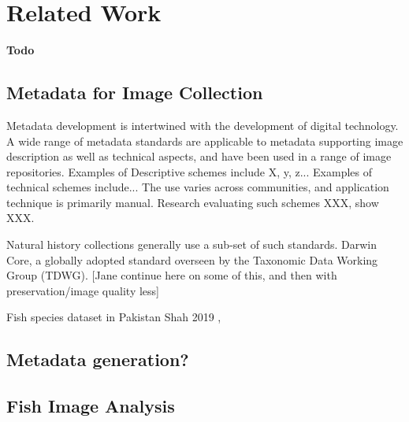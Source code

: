 \documentclass[conference]{IEEEtran}
\begin{document}
\section{Related Work}
\textbf{Todo}
\subsection{Metadata for Image Collection}
Metadata development is intertwined with the development of digital technology. A wide range of metadata standards are applicable to metadata supporting image description as well as technical aspects, and have been used in a range of image repositories. Examples of Descriptive schemes include X, y, z... Examples of technical schemes include... The use varies across communities, and application technique is primarily manual. Research evaluating such schemes XXX, show XXX. 

Natural history collections generally use a sub-set of such standards. Darwin Core, a globally adopted standard overseen by the Taxonomic Data Working Group (TDWG).  [Jane continue here on some of this, and then with preservation/image quality less]

Fish species dataset in Pakistan Shah 2019 \cite{Shah2019FishPakFS},

\subsection{Metadata generation?}

\subsection{Fish Image Analysis}
\end{document}
